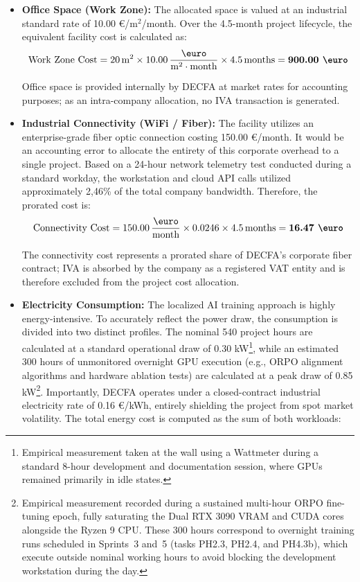 \begin{itemize}
    \item \textbf{Office Space (Work Zone):} The allocated space is valued at an industrial standard rate of 10.00 \euro/$\text{m}^2$/month. Over the 4.5-month project lifecycle, the equivalent facility cost is calculated as:
    \begin{equation}
        \text{Work Zone Cost} = 20 \, \text{m}^2 \times 10.00 \, \frac{\text{\euro}}{\text{m}^2 \cdot \text{month}} \times 4.5 \, \text{months} = \textbf{900.00 \euro}
    \end{equation}

    Office space is provided internally by DECFA at market rates for 
accounting purposes; as an intra-company allocation, no IVA 
transaction is generated.

    \item \textbf{Industrial Connectivity (WiFi / Fiber):} The facility utilizes an enterprise-grade fiber optic connection costing 150.00 \euro/month. It would be an accounting error to allocate the entirety of this corporate overhead to a single project. Based on a 24-hour network telemetry test conducted during a standard workday, the workstation and cloud API calls utilized approximately 2,46\% of the total company bandwidth. Therefore, the prorated cost is:
    \begin{equation}
        \text{Connectivity Cost} = 150.00 \, \frac{\text{\euro}}{\text{month}} \times 0.0246 \times 4.5 \, \text{months} = \textbf{16.47 \euro}
    \end{equation}

    The connectivity cost represents a prorated share of DECFA's 
corporate fiber contract; IVA is absorbed by the company as a 
registered VAT entity and is therefore excluded from the project 
cost allocation.

    \item \textbf{Electricity Consumption:} The localized AI training approach is highly energy-intensive. To accurately reflect the power draw, the consumption is divided into two distinct profiles. The nominal 540 project hours are calculated at a standard operational draw of 0.30 kW\footnote{Empirical measurement taken at the wall using a Wattmeter during a standard 8-hour development and documentation session, where GPUs remained primarily in idle states.}, while an estimated 300 hours of unmonitored overnight GPU execution (e.g., ORPO alignment algorithms and hardware ablation tests) are calculated at a peak draw of 0.85 kW\footnote{Empirical measurement recorded during a sustained multi-hour ORPO fine-tuning epoch, fully saturating the Dual RTX 3090 VRAM and CUDA cores alongside the Ryzen 9 CPU.
These 300 hours correspond to overnight training runs scheduled in
Sprints~3 and~5 (tasks PH2.3, PH2.4, and PH4.3b), which execute
outside nominal working hours to avoid blocking the development
workstation during the day.}. Importantly, DECFA operates under a closed-contract industrial electricity rate of 0.16 \euro/kWh, entirely shielding the project from spot market volatility. The total energy cost is computed as the sum of both workloads:
    

\end{itemize}
